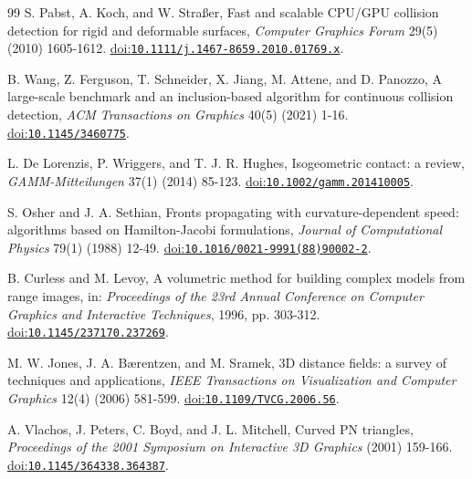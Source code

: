 \documentclass[preprint,12pt]{elsarticle}
\newcommand{\doi}[1]{\href{https://doi.org/#1}{doi:\nolinkurl{#1}}}
\begin{document}
\begin{thebibliography}{99}
S. Pabst, A. Koch, and W. Stra{\ss}er, Fast and scalable CPU/GPU collision detection for rigid and deformable surfaces, \emph{Computer Graphics Forum} 29(5) (2010) 1605-1612. \doi{10.1111/j.1467-8659.2010.01769.x}.

B. Wang, Z. Ferguson, T. Schneider, X. Jiang, M. Attene, and D. Panozzo, A large-scale benchmark and an inclusion-based algorithm for continuous collision detection, \emph{ACM Transactions on Graphics} 40(5) (2021) 1-16. \doi{10.1145/3460775}.

L. De Lorenzis, P. Wriggers, and T. J. R. Hughes, Isogeometric contact: a review, \emph{GAMM-Mitteilungen} 37(1) (2014) 85-123. \doi{10.1002/gamm.201410005}.

S. Osher and J. A. Sethian, Fronts propagating with curvature-dependent speed: algorithms based on Hamilton-Jacobi formulations, \emph{Journal of Computational Physics} 79(1) (1988) 12-49. \doi{10.1016/0021-9991(88)90002-2}.

B. Curless and M. Levoy, A volumetric method for building complex models from range images, in: \emph{Proceedings of the 23rd Annual Conference on Computer Graphics and Interactive Techniques}, 1996, pp. 303-312. \doi{10.1145/237170.237269}.

M. W. Jones, J. A. B{\ae}rentzen, and M. Sramek, 3D distance fields: a survey of techniques and applications, \emph{IEEE Transactions on Visualization and Computer Graphics} 12(4) (2006) 581-599. \doi{10.1109/TVCG.2006.56}.

A. Vlachos, J. Peters, C. Boyd, and J. L. Mitchell, Curved PN triangles, \emph{Proceedings of the 2001 Symposium on Interactive 3D Graphics} (2001) 159-166. \doi{10.1145/364338.364387}.

\end{thebibliography}
\end{document}
